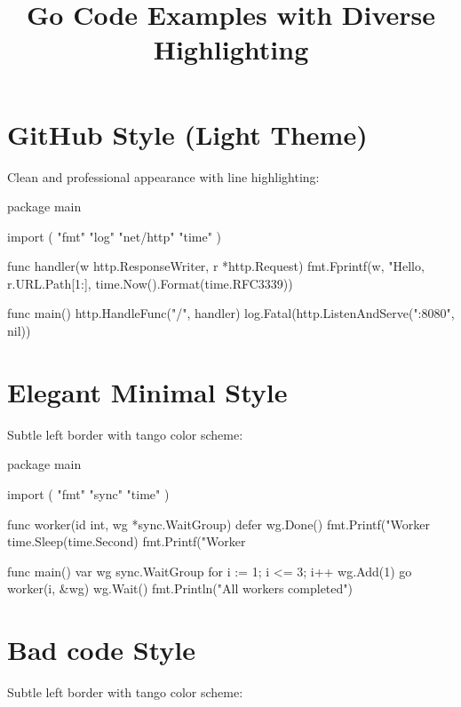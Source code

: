 \documentclass{article}
\begin{document}
\title{Go Code Examples with Diverse Highlighting}
\maketitle

\section{GitHub Style (Light Theme)}
Clean and professional appearance with line highlighting:

\begin{gocode}[title={\textbf{Web Server Example}}]
package main

import (
    "fmt"
    "log"
    "net/http"
    "time"
)

func handler(w http.ResponseWriter, r *http.Request) {
    fmt.Fprintf(w, "Hello, %
                r.URL.Path[1:], time.Now().Format(time.RFC3339))
}

func main() {
    http.HandleFunc("/", handler)
    log.Fatal(http.ListenAndServe(":8080", nil))
}
\end{gocode}

\section{Elegant Minimal Style}
Subtle left border with tango color scheme:

\begin{gocode-elegant}[title={\textbf{Concurrent Processing Example}}]
package main

import (
    "fmt"
    "sync"
    "time"
)

func worker(id int, wg *sync.WaitGroup) {
    defer wg.Done()
    fmt.Printf("Worker %
    time.Sleep(time.Second)
    fmt.Printf("Worker %
}

func main() {
    var wg sync.WaitGroup
    for i := 1; i <= 3; i++ {
        wg.Add(1)
        go worker(i, &wg)
    }
    wg.Wait()
    fmt.Println("All workers completed")
}
\end{gocode-elegant}

\section{Bad code Style}
Subtle left border with tango color scheme:
\end{document}

